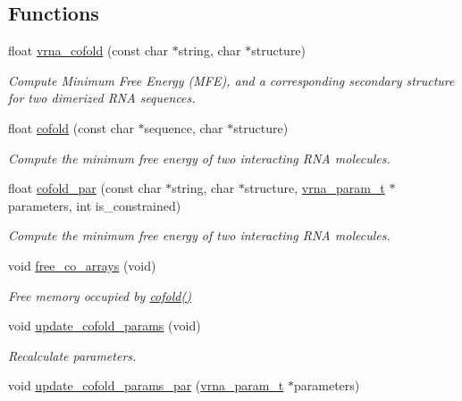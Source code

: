 \subsection*{Functions}
\begin{DoxyCompactItemize}
\item 
float \hyperlink{group__mfe__cofold_ga45515db181f17653ef7ef5487ef36d08}{vrna\+\_\+cofold} (const char $\ast$string, char $\ast$structure)
\begin{DoxyCompactList}\small\item\em Compute Minimum Free Energy (M\+F\+E), and a corresponding secondary structure for two dimerized R\+N\+A sequences. \end{DoxyCompactList}\item 
float \hyperlink{group__mfe__cofold_gabc8517f22cfe70595ee81fc837910d52}{cofold} (const char $\ast$sequence, char $\ast$structure)
\begin{DoxyCompactList}\small\item\em Compute the minimum free energy of two interacting R\+N\+A molecules. \end{DoxyCompactList}\item 
float \hyperlink{group__mfe__cofold_ga7612cfeeb1b793f1e4179b1eb53df1f3}{cofold\+\_\+par} (const char $\ast$string, char $\ast$structure, \hyperlink{group__energy__parameters_ga8a69ca7d787e4fd6079914f5343a1f35}{vrna\+\_\+param\+\_\+t} $\ast$parameters, int is\+\_\+constrained)
\begin{DoxyCompactList}\small\item\em Compute the minimum free energy of two interacting R\+N\+A molecules. \end{DoxyCompactList}\item 
void \hyperlink{group__mfe__cofold_gaafb33d7473eb9af9d1b168ca8761c41a}{free\+\_\+co\+\_\+arrays} (void)
\begin{DoxyCompactList}\small\item\em Free memory occupied by \hyperlink{group__mfe__cofold_gabc8517f22cfe70595ee81fc837910d52}{cofold()} \end{DoxyCompactList}\item 
void \hyperlink{group__mfe__cofold_ga4fcbf34e77b99bfbb2333d2ab0c41a57}{update\+\_\+cofold\+\_\+params} (void)
\begin{DoxyCompactList}\small\item\em Recalculate parameters. \end{DoxyCompactList}\item 
void \hyperlink{group__mfe__cofold_gaaadbd28b4e428710529ab4098fdacad3}{update\+\_\+cofold\+\_\+params\+\_\+par} (\hyperlink{group__energy__parameters_ga8a69ca7d787e4fd6079914f5343a1f35}{vrna\+\_\+param\+\_\+t} $\ast$parameters)

\end{DoxyCompactItemize}
